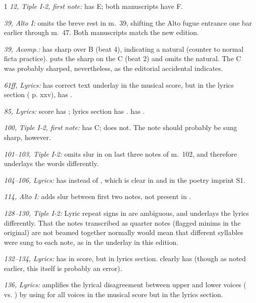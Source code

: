 \bigskip
\begin{hangparas}{\myparindent}{1}
%
\emph{12, Tiple I-2, first note: }
 has E; both manuscripts have F.

\emph{39, Alto I: }
 omits the breve rest in m.~39, shifting the Alto fugue entrance one bar earlier through m.~47. 
Both manuscripts match the new edition.

\emph{39, Acomp.: }
 has sharp over B (beat 4), indicating a natural (counter to normal ficta practice). 
 puts the sharp on the C (beat 2) and omits the natural. 
The C was probably sharped, nevertheless, as the editorial accidental indicates.

\emph{61ff, Lyrics: }
 has correct text underlay in the musical score, but in the lyrics section ( p. xxv), has .

\emph{85, Lyrics: }
 score has ;  lyrics section has .  has .

\emph{100, Tiple I-2, first note: }
 has C\sh;  does not. 
The note should probably be sung sharp, however.

\emph{101--103, Tiple I-2: }
 omits slur in  on last three notes of m.~102, and therefore underlays the words differently.

\emph{104--106, Lyrics: }
 has  instead of , which is clear in  and in the poetry imprint S1.

\emph{114, Alto I: }
 adds slur between first two notes, not present in .

\emph{128--130, Tiple I-2: }
Lyric repeat signs in  are ambiguous, and  underlays the lyrics differently. 
That the notes transcribed as quarter notes (flagged minims in the original) are not beamed together normally would mean that different syllables were sung to each note, as in the underlay in this edition.

\emph{132--134, Lyrics: }
 has  in score, but  in lyrics section.  clearly has  (though as noted earlier, this itself is probably an error).

\emph{136, Lyrics: }
 amplifies the lyrical disagreement between upper and lower voices ( vs. ) by using  for all voices in the musical score but  in the lyrics section.


\end{hangparas}
